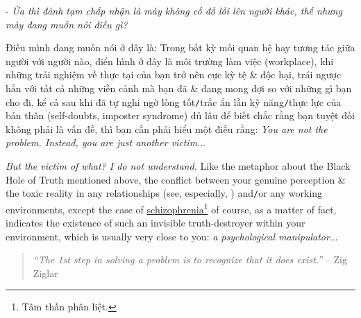 \documentclass[12pt,oneside]{book}
\begin{document}
- {\it Ừa thì đành tạm chấp nhận là mày không cố đỗ lỗi lên người khác, thế nhưng mày đang muốn nói điều gì?}

Điều mình đang muốn nói ở đây là: Trong bất kỳ mối quan hệ hay tương tác giữa người với người nào, điển hình ở đây là môi trường làm việc (workplace), khi những trải nghiệm về thực tại của bạn trở nên cực kỳ tệ \& độc hại, trái ngược hẳn với tất cả những viễn cảnh mà bạn đã \& đang mong đợi so với những gì bạn cho đi, kể cả sau khi đã tự nghi ngờ lòng tốt{\tt/}trắc ẩn lẫn kỹ năng{\tt/}thực lực của bản thân (self-doubts, imposter syndrome) đủ lâu để biết chắc rằng bạn tuyệt đối không phải là vấn đề, thì bạn cần phải hiểu một điều rằng: {\it You are not the problem. Instead, you are just another victim}$\ldots$

{\it But the victim of what? I do not understand.} Like the metaphor about the Black Hole of Truth mentioned above, the conflict between your genuine perception \& the toxic reality in any relationships (see, especially, \cite{Bancroft_why_he_do,Bancroft_why_he_do_VN}) and{\tt/}or any working environments, except the case of \href{https://en.wikipedia.org/wiki/Schizophrenia}{schizophrenia}\footnote{Tâm thần phân liệt.} of course, as a matter of fact, indicates the existence of such an invisible truth-destroyer within your environment, which is usually very close to you: {\it a psychological manipulator}$\ldots$

\begin{quotation}
	{\it``The 1st step in solving a problem is to recognize that it does exist.''} -- {\sc Zig Ziglar}
\end{quotation}
\end{document}
